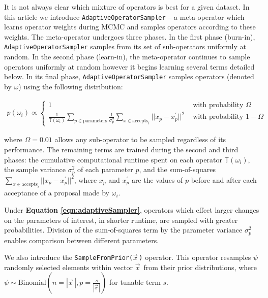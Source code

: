 \documentclass[10pt,letterpaper]{article}
\begin{document}
It is not always clear which mixture of operators is best for a given dataset.
In this article we introduce \texttt{AdaptiveOperatorSampler} -- a meta-operator which learns operator weights during MCMC and samples operators according to these weights.
The meta-operator undergoes three phases.
In the first phase (burn-in), \texttt{AdaptiveOperatorSampler} samples from its set of sub-operators uniformly at random.
In the second phase (learn-in), the meta-operator continues to sample operators uniformly at random however it begins learning several terms detailed below.
In its final phase, \texttt{AdaptiveOperatorSampler} samples operators (denoted by $\omega$) using the following distribution:


\begin{align}
\label{eqn:adaptiveSampler}
	p(\omega_i) \propto \begin{cases} 1 & \text{ with probability } \Omega \\ \frac{1}{\mathbb{T}(\omega_i)} \sum\limits_{p \in \text{parameters}} \frac{1}{\sigma^2_p}  \sum\limits_{x \in \text{accepts}_i}  || x_p - x_p^\prime ||^2 & \text{ with probability } 1-\Omega \end{cases}
\end{align}

where $\Omega = 0.01$ allows any sub-operator to be sampled regardless of its performance.
The remaining terms are trained during the second and third phases: the cumulative computational runtime spent on each operator $\mathbb{T}(\omega_i)$, the sample variance $\sigma^2_p$ of each parameter $p$, and the sum-of-squares $\sum\limits_{x \in \text{accepts}_i} ||x_p - x_p^\prime||^2$, where $x_p$ and $x_p^\prime$ are the values of $p$ before and after each acceptance of a proposal made by $\omega_i$. 




Under \textbf{Equation \ref{eqn:adaptiveSampler}}, operators which effect larger changes on the parameters of interest, in shorter runtime, are sampled with greater probabilities. 
Division of the sum-of-squares term by the parameter variance $\sigma^2_p$ enables comparison between different parameters.


We also introduce the \texttt{SampleFromPrior($\vec{x}^{\,}$)} operator.
This operator resamples $\psi$ randomly selected elements within vector $\vec{x}^{\,}$ from their prior distributions, where $\psi \sim \text{Binomial}(n=|\vec{x}^{\,}|, p=\frac{s}{|\vec{x}^{\,}|})$ for tunable term $s$.
\end{document}
